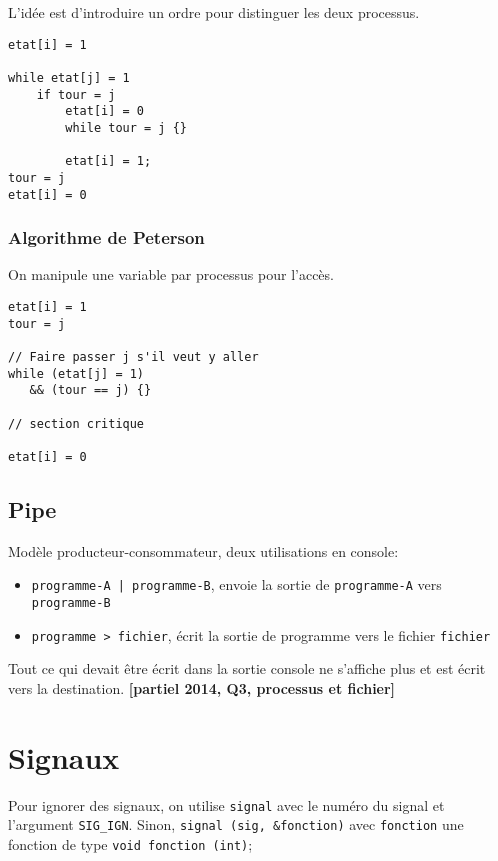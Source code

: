 \documentclass[a4paper]{article}
\begin{document}
\begin{multicols*}{2}
    L'idée est d'introduire un ordre pour distinguer les deux processus.
    \begin{lstlisting}[frame=shadowbox]
etat[i] = 1

while etat[j] = 1
    if tour = j
        etat[i] = 0
        while tour = j {}
        
        etat[i] = 1;
tour = j
etat[i] = 0
    \end{lstlisting}

    \subsubsection{Algorithme de Peterson}

    On manipule une variable par processus pour l'accès.
    \begin{lstlisting}[frame=shadowbox]
etat[i] = 1
tour = j

// Faire passer j s'il veut y aller
while (etat[j] = 1) 
   && (tour == j) {} 

// section critique

etat[i] = 0
    \end{lstlisting}

    \subsection{Pipe}

    Modèle producteur-consommateur, deux utilisations en console:
    \begin{itemize}
        \item \texttt{programme-A | programme-B}, envoie la sortie de \texttt{programme-A} vers \texttt{programme-B}
        \item \texttt{programme > fichier}, écrit la sortie de programme vers le fichier \texttt{fichier}
    \end{itemize}

    Tout ce qui devait être écrit dans la sortie console ne s'affiche plus et est écrit vers la destination. \textbf{[partiel 2014, Q3, processus et fichier]}



    \section{Signaux}

    Pour ignorer des signaux, on utilise \texttt{signal} avec le numéro du signal et l'argument \texttt{SIG\_IGN}. Sinon, \texttt{signal (sig, \&fonction)} avec \texttt{fonction} une fonction de type \texttt{void fonction (int)};


\end{multicols*}
\end{document}
